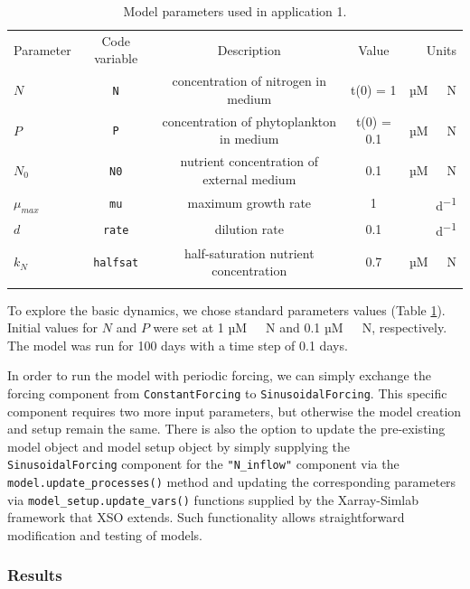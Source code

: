 \documentclass[journal abbreviation, manuscript]{copernicus}
\begin{document}
%
\begin{table}[t]
\caption{Model parameters used in application 1.}
\begin{tabular}{l c c c r}
\tophline
Parameter & Code variable & Description & Value & Units \\
\middlehline

$N$ & \texttt{N} & concentration of nitrogen in medium & t(0) = 1 & \unit{µM \ N} \\
$P$ & \texttt{P} & concentration of phytoplankton in medium & t(0) = 0.1 & \unit{µM \ N} \\
$N_0$ & \texttt{N0} & nutrient concentration of external medium & 0.1 & \unit{µM \ N} \\
$\mu_{max}$ & \texttt{mu} & maximum growth rate & 1 & \unit{d^{-1}} \\
$d$ & \texttt{rate} & dilution rate & 0.1 & \unit{d^{-1}}\\
$k_N$ & \texttt{halfsat} & half-saturation nutrient concentration & 0.7 & \unit{µM \ N}\\

\bottomhline
\end{tabular}
\label{Table:UseCase1Parameters}
\end{table}
%

To explore the basic dynamics, we chose standard parameters values (Table \ref{Table:UseCase1Parameters}). Initial values for $N$ and $P$ were set at 1 \unit{µM \ N} and 0.1 \unit{µM \ N}, respectively. The model was run for 100 days with a time step of 0.1 days.

In order to run the model with periodic forcing, we can simply exchange the forcing component from \texttt{ConstantForcing} to \texttt{SinusoidalForcing}. This specific component requires two more input parameters, but otherwise the model creation and setup remain the same. There is also the option to update the pre-existing model object and model setup object by simply supplying the \texttt{SinusoidalForcing} component for the \texttt{"N\_inflow"} component via the \texttt{model.update\_processes()} method and updating the corresponding parameters via \texttt{model\_setup.update\_vars()} functions supplied by the Xarray-Simlab framework that XSO extends. Such functionality allows straightforward modification and testing of models.

\subsubsection{Results}
\end{document}
